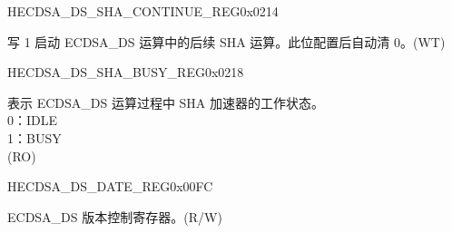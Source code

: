 \begin{register}{H}{ECDSA\_DS\_SHA\_CONTINUE\_REG}{0x0214}\label{regdesc:ECDSADSSHACONTINUEREG}
%
%
\regnewline%
\begin{regdesc}\begin{reglist}
\label{fielddesc:ECDSADSSHACONTINUE}\item [ECDSA\_DS\_SHA\_CONTINUE] 写 1 启动 ECDSA\_DS 运算中的后续 SHA 运算。此位配置后自动清 0。(WT)
\end{reglist}\end{regdesc}
\end{register}


\begin{register}{H}{ECDSA\_DS\_SHA\_BUSY\_REG}{0x0218}\label{regdesc:ECDSADSSHABUSYREG}
%
%
\regnewline%
\begin{regdesc}\begin{reglist}
\label{fielddesc:ECDSADSSHABUSY}\item [ECDSA\_DS\_SHA\_BUSY] 表示 ECDSA\_DS 运算过程中 SHA 加速器的工作状态。\\
0：IDLE\\
1：BUSY\\
(RO)
\end{reglist}\end{regdesc}
\end{register}


\begin{register}{H}{ECDSA\_DS\_DATE\_REG}{0x00FC}\label{regdesc:ECDSADSDATEREG}
%
%
\regnewline%
\begin{regdesc}\begin{reglist}
\label{fielddesc:ECDSADSDATE}\item [ECDSA\_DS\_DATE] ECDSA\_DS 版本控制寄存器。(R/W)
\end{reglist}\end{regdesc}
\end{register}
